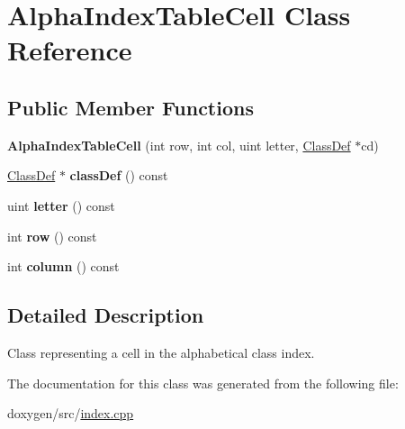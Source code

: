 \hypertarget{class_alpha_index_table_cell}{}\section{Alpha\+Index\+Table\+Cell Class Reference}
\label{class_alpha_index_table_cell}
\subsection*{Public Member Functions}
\begin{DoxyCompactItemize}
\item 
\mbox{\label{class_alpha_index_table_cell_ae4cedd00f90fe112a3ef77760056e716}} 
{\bfseries Alpha\+Index\+Table\+Cell} (int row, int col, uint letter, \mbox{\hyperlink{class_class_def}{Class\+Def}} $\ast$cd)
\item 
\mbox{\label{class_alpha_index_table_cell_af855b2fd41fe039cc34c49eef6f860d5}} 
\mbox{\hyperlink{class_class_def}{Class\+Def}} $\ast$ {\bfseries class\+Def} () const
\item 
\mbox{\label{class_alpha_index_table_cell_ae0ec1ed6f72d77f74b50c9dbf95fd468}} 
uint {\bfseries letter} () const
\item 
\mbox{\label{class_alpha_index_table_cell_a1c49351a1bc2c590b1561a2f65566a17}} 
int {\bfseries row} () const
\item 
\mbox{\label{class_alpha_index_table_cell_a3faaa897f1d67548f2abd49c3d074c7f}} 
int {\bfseries column} () const
\end{DoxyCompactItemize}


\subsection{Detailed Description}
Class representing a cell in the alphabetical class index. 

The documentation for this class was generated from the following file\+:\begin{DoxyCompactItemize}
\item 
doxygen/src/\mbox{\hyperlink{index_8cpp}{index.\+cpp}}\end{DoxyCompactItemize}
